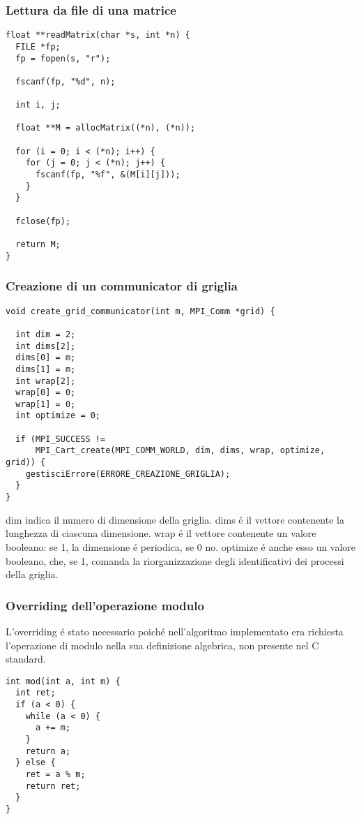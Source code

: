 \subsubsection{Lettura da file di una matrice}
\begin{lstlisting}
float **readMatrix(char *s, int *n) {
  FILE *fp;
  fp = fopen(s, "r");

  fscanf(fp, "%d", n);

  int i, j;

  float **M = allocMatrix((*n), (*n));

  for (i = 0; i < (*n); i++) {
    for (j = 0; j < (*n); j++) {
      fscanf(fp, "%f", &(M[i][j]));
    }
  }

  fclose(fp);

  return M;
}
\end{lstlisting}

\subsubsection{Creazione di un communicator di griglia}
\begin{lstlisting}
void create_grid_communicator(int m, MPI_Comm *grid) {

  int dim = 2;
  int dims[2];
  dims[0] = m;
  dims[1] = m;
  int wrap[2];
  wrap[0] = 0;
  wrap[1] = 0;
  int optimize = 0;

  if (MPI_SUCCESS !=
      MPI_Cart_create(MPI_COMM_WORLD, dim, dims, wrap, optimize, grid)) {
    gestisciErrore(ERRORE_CREAZIONE_GRIGLIA);
  }
}
\end{lstlisting}
dim indica il numero di dimensione della griglia.
dims é il vettore contenente la lunghezza di ciascuna dimensione.
wrap é il vettore contenente un valore booleano: se 1, la dimensione é periodica, se 0 no.
optimize é anche esso un valore booleano, che, se 1, comanda la riorganizzazione degli identificativi dei processi della griglia.
\subsubsection{Overriding dell'operazione modulo}
L'overriding é stato necessario poiché nell'algoritmo implementato era richiesta l'operazione di modulo nella sua definizione algebrica, non presente nel C standard.
\begin{lstlisting}
int mod(int a, int m) {
  int ret;
  if (a < 0) {
    while (a < 0) {
      a += m;
    }
    return a;
  } else {
    ret = a % m;
    return ret;
  }
}
\end{lstlisting}
